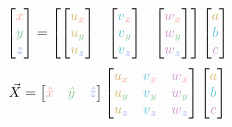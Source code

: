 \documentclass[preview]{standalone}
\begin{document}
$$\begin{bmatrix}\textcolor[HTML]{f9a598}{x}\\\textcolor[HTML]{87c993}{y}\\\textcolor[HTML]{94acef}{z}\end{bmatrix} = \begin{bmatrix}
\begin{bmatrix}\textcolor[HTML]{d4b76b}{u}_{\textcolor[HTML]{f9a598}{x}}\\\textcolor[HTML]{d4b76b}{u}_{\textcolor[HTML]{87c993}{y}}\\\textcolor[HTML]{d4b76b}{u}_{\textcolor[HTML]{94acef}{z}}\end{bmatrix} &
\begin{bmatrix}\textcolor[HTML]{58c4d5}{v}_{\textcolor[HTML]{f9a598}{x}}\\\textcolor[HTML]{58c4d5}{v}_{\textcolor[HTML]{87c993}{y}}\\\textcolor[HTML]{58c4d5}{v}_{\textcolor[HTML]{94acef}{z}}\end{bmatrix} &
\begin{bmatrix}\textcolor[HTML]{ce93ca}{w}_{\textcolor[HTML]{f9a598}{x}}\\\textcolor[HTML]{ce93ca}{w}_{\textcolor[HTML]{87c993}{y}}\\\textcolor[HTML]{ce93ca}{w}_{\textcolor[HTML]{94acef}{z}}\end{bmatrix}
\end{bmatrix}\begin{bmatrix}\textcolor[HTML]{d4b76b}{a}\\\textcolor[HTML]{58c4d5}{b}\\\textcolor[HTML]{ce93ca}{c}\end{bmatrix}$$
$$\vec{X} = \begin{bmatrix}\textcolor[HTML]{f9a598}{\hat{x}}&\textcolor[HTML]{87c993}{\hat{y}}&\textcolor[HTML]{94acef}{\hat{z}}\end{bmatrix}\begin{bmatrix}
\textcolor[HTML]{d4b76b}{u}_{\textcolor[HTML]{f9a598}{x}}&\textcolor[HTML]{58c4d5}{v}_{\textcolor[HTML]{f9a598}{x}}&\textcolor[HTML]{ce93ca}{w}_{\textcolor[HTML]{f9a598}{x}}\\
\textcolor[HTML]{d4b76b}{u}_{\textcolor[HTML]{87c993}{y}}&\textcolor[HTML]{58c4d5}{v}_{\textcolor[HTML]{87c993}{y}}&\textcolor[HTML]{ce93ca}{w}_{\textcolor[HTML]{87c993}{y}}\\
\textcolor[HTML]{d4b76b}{u}_{\textcolor[HTML]{94acef}{z}}&\textcolor[HTML]{58c4d5}{v}_{\textcolor[HTML]{94acef}{z}}&\textcolor[HTML]{ce93ca}{w}_{\textcolor[HTML]{94acef}{z}}
\end{bmatrix}\begin{bmatrix}\textcolor[HTML]{d4b76b}{a}\\\textcolor[HTML]{58c4d5}{b}\\\textcolor[HTML]{ce93ca}{c}\end{bmatrix}$$
\end{document}
